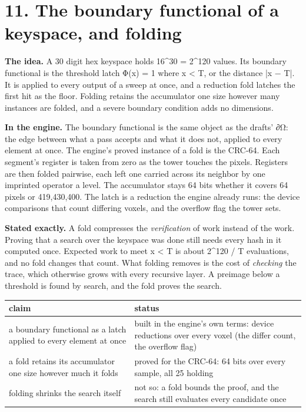 \section{\texorpdfstring{11. The boundary functional of a keyspace, and folding}{11. The boundary functional of a keyspace, and folding}}

\textbf{The idea.} A 30 digit hex keyspace holds 16\textasciicircum{}30 = 2\textasciicircum{}120 values. Its boundary functional is the threshold latch Φ(x) = 1 where x < T, or the distance |x − T|. It is applied to every output of a sweep at once, and a reduction fold latches the first hit as the floor. Folding retains the accumulator one size however many instances are folded, and a severe boundary condition adds no dimensions.

\textbf{In the engine.} The boundary functional is the same object as the drafts' ∂Ω: the edge between what a pass accepts and what it does not, applied to every element at once. The engine's proved instance of a fold is the CRC-64. Each segment's register is taken from zero as the tower touches the pixels. Registers are then folded pairwise, each left one carried across its neighbor by one imprinted operator a level. The accumulator stays 64 bits whether it covers 64 pixels or 419,430,400. The latch is a reduction the engine already runs: the device comparisons that count differing voxels, and the overflow flag the tower sets.

\textbf{Stated exactly.} A fold compresses the \emph{verification} of work instead of the work. Proving that a search over the keyspace was done still needs every hash in it computed once. Expected work to meet x < T is about 2\textasciicircum{}120 / T evaluations, and no fold changes that count. What folding removes is the cost of \emph{checking} the trace, which otherwise grows with every recursive layer. A preimage below a threshold is found by search, and the fold proves the search.

{\small
\setlength{\tabcolsep}{6pt}
\begin{longtable}{>{\RaggedRight\arraybackslash}p{}>{\RaggedRight\arraybackslash}p{}}
\toprule
claim & status \\
\midrule
\endhead
a boundary functional as a latch applied to every element at once & built in the engine's own terms: device reductions over every voxel (the differ count, the overflow flag) \\
a fold retains its accumulator one size however much it folds & proved for the CRC-64: 64 bits over every sample, all 25 holding \\
folding shrinks the search itself & not so: a fold bounds the proof, and the search still evaluates every candidate once \\
\bottomrule
\end{longtable}
}

